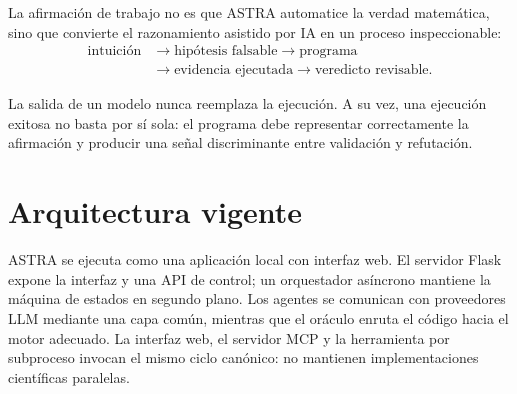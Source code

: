 \documentclass[11pt,a4paper]{article}
\begin{document}
La afirmación de trabajo no es que ASTRA automatice la verdad matemática, sino que convierte el razonamiento asistido por IA en un proceso inspeccionable:
\[
\begin{aligned}
\text{intuición}&\longrightarrow\text{hipótesis falsable}
\longrightarrow\text{programa}\\
&\longrightarrow\text{evidencia ejecutada}
\longrightarrow\text{veredicto revisable}.
\end{aligned}
\]

La salida de un modelo nunca reemplaza la ejecución. A su vez, una ejecución exitosa no basta por sí sola: el programa debe representar correctamente la afirmación y producir una señal discriminante entre validación y refutación.

\section{Arquitectura vigente}

ASTRA se ejecuta como una aplicación local con interfaz web. El servidor Flask expone la interfaz y una API de control; un orquestador asíncrono mantiene la máquina de estados en segundo plano. Los agentes se comunican con proveedores LLM mediante una capa común, mientras que el oráculo enruta el código hacia el motor adecuado. La interfaz web, el servidor MCP y la herramienta por subproceso invocan el mismo ciclo canónico: no mantienen implementaciones científicas paralelas.
\end{document}
